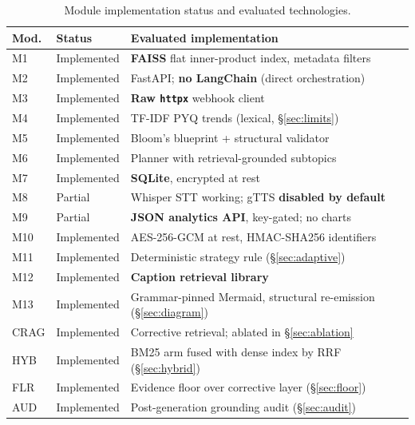 \documentclass[conference]{IEEEtran}
\begin{document}
\begin{table}[htbp]
\caption{Module implementation status and evaluated technologies.}
\label{tab:status}
\centering
\small
\setlength{\tabcolsep}{3pt}
\begin{tabular}{@{}p{0.75cm} p{1.5cm} p{5.1cm}@{}}
\toprule
\textbf{Mod.} & \textbf{Status} & \textbf{Evaluated implementation} \\
\midrule
M1 & Implemented & \textbf{FAISS} flat inner-product index, metadata filters \\
M2 & Implemented & FastAPI; \textbf{no LangChain} (direct orchestration) \\
M3 & Implemented & \textbf{Raw \texttt{httpx}} webhook client \\
M4 & Implemented & TF-IDF PYQ trends (lexical, §\ref{sec:limits}) \\
M5 & Implemented & Bloom's blueprint + structural validator \\
M6 & Implemented & Planner with retrieval-grounded subtopics \\
M7 & Implemented & \textbf{SQLite}, encrypted at rest \\
M8 & Partial & Whisper STT working; gTTS \textbf{disabled by default} \\
M9 & Partial & \textbf{JSON analytics API}, key-gated; no charts \\
M10 & Implemented & AES-256-GCM at rest, HMAC-SHA256 identifiers \\
M11 & Implemented & Deterministic strategy rule (§\ref{sec:adaptive}) \\
M12 & Implemented & \textbf{Caption retrieval library} \\
M13 & Implemented & Grammar-pinned Mermaid, structural re-emission (§\ref{sec:diagram}) \\
CRAG & Implemented & Corrective retrieval; ablated in §\ref{sec:ablation} \\
HYB & Implemented & BM25 arm fused with dense index by RRF (§\ref{sec:hybrid}) \\
FLR & Implemented & Evidence floor over corrective layer (§\ref{sec:floor}) \\
AUD & Implemented & Post-generation grounding audit (§\ref{sec:audit}) \\
\bottomrule
\end{tabular}
\end{table}
\end{document}
